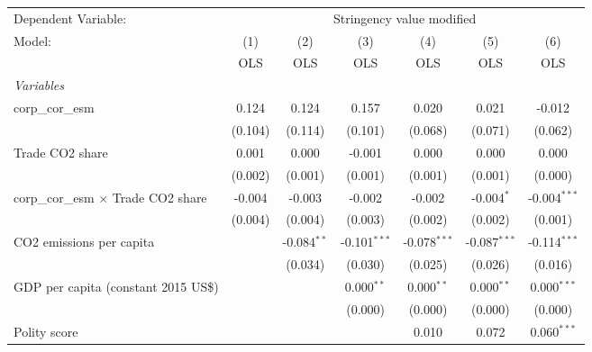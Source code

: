 
\begingroup
\centering
\begin{tabular}{lcccccc}
   \toprule
   Dependent Variable: & \multicolumn{6}{c}{Stringency value modified}\\
   Model:                                     & (1)     & (2)           & (3)            & (4)            & (5)            & (6)\\  
                                              &  OLS    & OLS           & OLS            & OLS            & OLS            & OLS\\  
   \midrule
   \emph{Variables}\\
   corp\_cor\_esm                             & 0.124   & 0.124         & 0.157          & 0.020          & 0.021          & -0.012\\   
                                              & (0.104) & (0.114)       & (0.101)        & (0.068)        & (0.071)        & (0.062)\\   
   Trade CO2 share                            & 0.001   & 0.000         & -0.001         & 0.000          & 0.000          & 0.000\\   
                                              & (0.002) & (0.001)       & (0.001)        & (0.001)        & (0.001)        & (0.000)\\   
   corp\_cor\_esm $\times$ Trade CO2 share    & -0.004  & -0.003        & -0.002         & -0.002         & -0.004$^{*}$   & -0.004$^{***}$\\   
                                              & (0.004) & (0.004)       & (0.003)        & (0.002)        & (0.002)        & (0.001)\\   
   CO2 emissions per capita                   &         & -0.084$^{**}$ & -0.101$^{***}$ & -0.078$^{***}$ & -0.087$^{***}$ & -0.114$^{***}$\\   
                                              &         & (0.034)       & (0.030)        & (0.025)        & (0.026)        & (0.016)\\   
   GDP per capita (constant 2015 US\$)        &         &               & 0.000$^{**}$   & 0.000$^{**}$   & 0.000$^{**}$   & 0.000$^{***}$\\   
                                              &         &               & (0.000)        & (0.000)        & (0.000)        & (0.000)\\   
   Polity score                               &         &               &                & 0.010          & 0.072          & 0.060$^{***}$\\   

\end{tabular}
